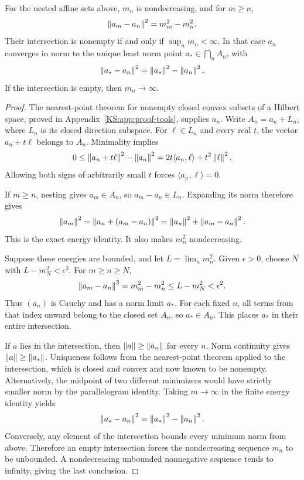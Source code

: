 \begin{KStheorem}\label{KS:WR02}
For the nested affine sets above, $m_n$ is nondecreasing, and for $m\ge n$,
\begin{equation}\label{KS:eq:nested-energy}
 \left\lVert a_m-a_n\right\rVert^2=m_m^2-m_n^2.
\end{equation}
Their intersection is nonempty if and only if $\sup_n m_n<\infty$. In that case $a_n$ converges in norm to the unique least norm point $a_*\in\bigcap_n A_n$, with
\[
 \left\lVert a_*-a_n\right\rVert^2=\left\lVert a_*\right\rVert^2-\left\lVert a_n\right\rVert^2.
\]
If the intersection is empty, then $m_n\to\infty$.
\end{KStheorem}
\begin{proof}
The nearest-point theorem for nonempty closed convex subsets of a Hilbert space, proved in Appendix~\ref{KS:app:proof-tools}, supplies $a_n$. Write $A_n=a_n+L_n$, where $L_n$ is its closed direction subspace. For $\ell\in L_n$ and every real $t$, the vector $a_n+t\ell$ belongs to $A_n$. Minimality implies
\[
 0\le\left\lVert a_n+t\ell\right\rVert^2-\left\lVert a_n\right\rVert^2
 =2t\langle a_n,\ell\rangle+t^2\left\lVert\ell\right\rVert^2.
\]
Allowing both signs of arbitrarily small $t$ forces $\langle a_n,\ell\rangle=0$.

If $m\ge n$, nesting gives $a_m\in A_n$, so $a_m-a_n\in L_n$. Expanding its norm therefore gives
\[
 \left\lVert a_m\right\rVert^2
 =\left\lVert a_n+(a_m-a_n)\right\rVert^2
 =\left\lVert a_n\right\rVert^2+\left\lVert a_m-a_n\right\rVert^2.
\]
This is the exact energy identity. It also makes $m_n^2$ nondecreasing.

Suppose these energies are bounded, and let $L=\lim_n m_n^2$. Given $\epsilon>0$, choose $N$ with $L-m_N^2<\epsilon^2$. For $m\ge n\ge N$,
\[
 \left\lVert a_m-a_n\right\rVert^2=m_m^2-m_n^2\le L-m_N^2<\epsilon^2.
\]
Thus $(a_n)$ is Cauchy and has a norm limit $a_*$. For each fixed $n$, all terms from that index onward belong to the closed set $A_n$, so $a_*\in A_n$. This places $a_*$ in their entire intersection.

If $a$ lies in the intersection, then $\left\lVert a\right\rVert\ge\left\lVert a_n\right\rVert$ for every $n$. Norm continuity gives $\left\lVert a\right\rVert\ge\left\lVert a_*\right\rVert$. Uniqueness follows from the nearest-point theorem applied to the intersection, which is closed and convex and now known to be nonempty. Alternatively, the midpoint of two different minimizers would have strictly smaller norm by the parallelogram identity. Taking $m\to\infty$ in the finite energy identity yields
\[
 \left\lVert a_*-a_n\right\rVert^2=\left\lVert a_*\right\rVert^2-\left\lVert a_n\right\rVert^2.
\]
Conversely, any element of the intersection bounds every minimum norm from above. Therefore an empty intersection forces the nondecreasing sequence $m_n$ to be unbounded. A nondecreasing unbounded nonnegative sequence tends to infinity, giving the last conclusion.
\end{proof}

